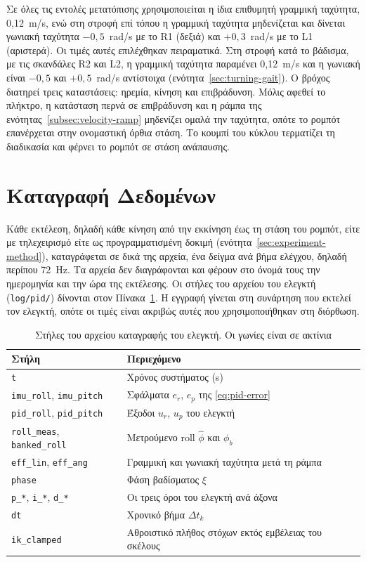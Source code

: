 \documentclass[11pt]{report}
\begin{document}
Σε όλες τις εντολές μετατόπισης χρησιμοποιείται η ίδια επιθυμητή γραμμική
ταχύτητα, 0,12~m/s, ενώ στη στροφή επί τόπου η γραμμική ταχύτητα μηδενίζεται και
δίνεται γωνιακή ταχύτητα $-0{,}5$~rad/s με το R1 (δεξιά) και $+0{,}3$~rad/s με το
L1 (αριστερά). Οι τιμές αυτές επιλέχθηκαν πειραματικά. Στη στροφή κατά το βάδισμα, με τις σκανδάλες R2 και L2, η γραμμική ταχύτητα
παραμένει 0,12~m/s και η γωνιακή είναι $-0{,}5$ και $+0{,}5$~rad/s αντίστοιχα
(ενότητα~\ref{sec:turning-gait}). Ο βρόχος διατηρεί τρεις καταστάσεις: ηρεμία,
κίνηση και επιβράδυνση. Μόλις αφεθεί το πλήκτρο, η κατάσταση περνά σε
επιβράδυνση και η ράμπα της ενότητας~\ref{subsec:velocity-ramp} μηδενίζει ομαλά
την ταχύτητα, οπότε το ρομπότ επανέρχεται στην ονομαστική όρθια στάση. Το κουμπί
του κύκλου τερματίζει τη διαδικασία και φέρνει το ρομπότ σε στάση ανάπαυσης.


\section{Καταγραφή Δεδομένων}
\label{sec:data-logging}
Κάθε εκτέλεση, δηλαδή κάθε κίνηση από την εκκίνηση έως τη στάση του ρομπότ, είτε
με τηλεχειρισμό είτε ως προγραμματισμένη δοκιμή
(ενότητα~\ref{sec:experiment-method}), καταγράφεται σε δικά της αρχεία, ένα
δείγμα ανά βήμα ελέγχου, δηλαδή περίπου 72~Hz. Τα αρχεία δεν διαγράφονται και
φέρουν στο όνομά τους την ημερομηνία και την ώρα της εκτέλεσης. Οι στήλες του
αρχείου του ελεγκτή (\texttt{log/pid/}) δίνονται στον
Πίνακα~\ref{tab:log-columns}. Η εγγραφή γίνεται στη συνάρτηση που εκτελεί τον
ελεγκτή, οπότε οι τιμές είναι ακριβώς αυτές που χρησιμοποιήθηκαν στη διόρθωση.

\begin{table}[htbp]
    \centering
    \small
    \begin{tabular}{@{}l l@{}}
        \toprule
        Στήλη & Περιεχόμενο \\
        \midrule
        \texttt{t} & Χρόνος συστήματος (s) \\
        \texttt{imu\_roll}, \texttt{imu\_pitch} & Σφάλματα $e_r$, $e_p$ της \eqref{eq:pid-error} \\
        \texttt{pid\_roll}, \texttt{pid\_pitch} & Έξοδοι $u_r$, $u_p$ του ελεγκτή \\
        \texttt{roll\_meas}, \texttt{banked\_roll} & Μετρούμενο roll $\hat{\phi}$ και $\phi_b$ \\
        \texttt{eff\_lin}, \texttt{eff\_ang} & Γραμμική και γωνιακή ταχύτητα μετά τη ράμπα \\
        \texttt{phase} & Φάση βαδίσματος $\xi$ \\
        \texttt{p\_*}, \texttt{i\_*}, \texttt{d\_*} & Οι τρεις όροι του ελεγκτή ανά άξονα \\
        \texttt{dt} & Χρονικό βήμα $\Delta t_k$ \\
        \texttt{ik\_clamped} & Αθροιστικό πλήθος στόχων εκτός εμβέλειας του σκέλους \\
        \bottomrule
    \end{tabular}
    \caption[Στήλες του αρχείου καταγραφής του ελεγκτή]{Στήλες του αρχείου
    καταγραφής του ελεγκτή. Οι γωνίες είναι σε ακτίνια}
    \label{tab:log-columns}
\end{table}
\end{document}
